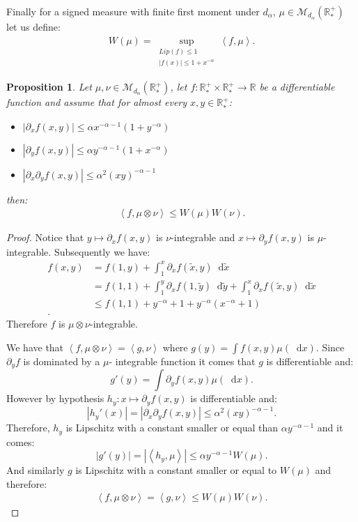\documentclass[11pt,a4paper]{article}
\newcommand{\RR}{\mathbb{R}}
\newcommand{\RRP}{\mathbb{R}^+_*}
\newcommand{\MC}{\mathcal{M}}
\newcommand{\brac}[1]{\left\langle#1\right\rangle}
\newcommand{\dd}{\mathop{}\!\mathrm{d}}
\newtheorem{proposition}[theorem]{Proposition}
\begin{document}
Finally for a signed measure with finite first moment under $d_\alpha$, $\mu \in \MC_{d_\alpha}(\RRP)$ let us define:
\begin{align*}
    W(\mu) = \sup\limits_{\substack{Lip(f) \leq 1\\ |f(x)| \leq 1 + x^{-\alpha}}} \brac{f,\mu}.
\end{align*}
\begin{proposition}\label{prop:characterization-product}
    Let $\mu,\nu \in \MC_{d_\alpha}(\RRP)$, let $f : \RRP\times \RRP \to \RR$ be a differentiable function and assume that for almost every $x,y \in \RRP$:
    \begin{itemize}
        \item $\left|\partial_x f(x,y)\right| \leq \alpha  x^{-\alpha - 1}(1 + y^{-\alpha})$
        \item $\left|\partial_y f(x,y)\right| \leq \alpha y^{-\alpha - 1} (1 + x^{-\alpha})$
        \item $\left|\partial_x \partial_y f(x,y)\right| \leq \alpha^2 (xy)^{-\alpha - 1}$
    \end{itemize}
    then:
    \begin{align*}
        \brac{f,\mu\otimes \nu} \leq W(\mu)W(\nu).
    \end{align*}
\end{proposition}
\begin{proof}
    Notice that $y \mapsto \partial_x f(x,y)$ is $\nu$-integrable and $x \mapsto \partial_y f(x,y)$ is $\mu$-integrable. Subsequently we have:
    \begin{align*}
        f(x,y) &= f(1,y) + \int_1^x \partial_x f(\tilde{x},y) \dd \tilde{x}\\
        &= f(1,1) + \int_1^y \partial_x f(1,\tilde{y}) \dd \tilde{y} + \int_1^x \partial_x f(\tilde{x},y) \dd \tilde{x}\\
        &\leq f(1,1) + y^{-\alpha} + 1 + y^{-\alpha}(x^{-\alpha} + 1)\\.
    \end{align*}
    Therefore $f$ is $\mu\otimes \nu$-integrable.

    We have that $\brac{f,\mu\otimes \nu} = \brac{g,\nu}$ where $g(y) = \int f(x,y) \mu(\dd x)$. Since $\partial_y f$ is dominated by a $\mu$- integrable function it comes that $g$ is differentiable and:
    \[ g'(y) = \int \partial_y f(x,y) \mu(\dd x).\]
    However by hypothesis $h_y : x \mapsto \partial_y f(x,y)$ is differentiable and:
    \[
    |h_y'(x)| = \left|\partial_x \partial_y f(x,y)\right| \leq \alpha^2 (xy)^{-\alpha - 1}.
    \]
    Therefore, $h_y$ is Lipschitz with a constant smaller or equal than $\alpha y^{-\alpha - 1}$ and it comes:
    \[
    |g'(y)| = \left| \brac{h_y,\mu}\right| \leq \alpha y^{-\alpha - 1}W(\mu).
    \]
    And similarly $g$ is Lipschitz with a constant smaller or equal to $W(\mu)$ and therefore:
    \begin{align*}
        \brac{f,\mu\otimes\nu} = \brac{g,\nu} \leq W(\mu)W(\nu).
    \end{align*}
\end{proof}
\end{document}
